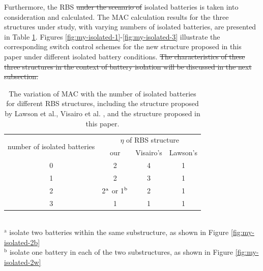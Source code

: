 \documentclass{article}
\providecommand{\DIFadd}[1]{{\protect\color{blue}\uwave{#1}}} %
\providecommand{\DIFdel}[1]{{\protect\color{red}\sout{#1}}}                      %
\providecommand{\DIFaddbegin}{} %
\providecommand{\DIFaddend}{} %
\providecommand{\DIFdelbegin}{} %
\providecommand{\DIFdelend}{} %
\providecommand{\DIFaddFL}[1]{\DIFadd{#1}} %
\providecommand{\DIFdelFL}[1]{\DIFdel{#1}} %
\providecommand{\DIFaddbeginFL}{} %
\providecommand{\DIFaddendFL}{} %
\providecommand{\DIFdelbeginFL}{} %
\providecommand{\DIFdelendFL}{} %
\newcommand{\DIFscaledelfig}{0.5}
\newlength{\DIFdelgraphicswidth} %
\newlength{\DIFdelgraphicsheight} %
\newcommand{\DIFaddincludegraphics}[2][]{{\color{blue}\fbox{\DIFOincludegraphics[#1]{#2}}}} %
\newcommand{\DIFdelincludegraphics}[2][]{%
\sbox{\DIFdelgraphicsbox}{\DIFOincludegraphics[#1]{#2}}%
\settoboxwidth{\DIFdelgraphicswidth}{\DIFdelgraphicsbox} %
\settoboxtotalheight{\DIFdelgraphicsheight}{\DIFdelgraphicsbox} %
\scalebox{\DIFscaledelfig}{%
\parbox[b]{\DIFdelgraphicswidth}{\usebox{\DIFdelgraphicsbox}\\[-\baselineskip] \rule{\DIFdelgraphicswidth}{0em}}\llap{\resizebox{\DIFdelgraphicswidth}{\DIFdelgraphicsheight}{%
\setlength{\unitlength}{\DIFdelgraphicswidth}%
\begin{picture}(1,1)%
\thicklines\linethickness{2pt} %
{\color[rgb]{1,0,0}\put(0,0){\framebox(1,1){}}}%
{\color[rgb]{1,0,0}\put(0,0){\line( 1,1){1}}}%
{\color[rgb]{1,0,0}\put(0,1){\line(1,-1){1}}}%
\end{picture}%
}\hspace*{3pt}}} %
} %
\DeclareRobustCommand{\DIFaddbegin}{\DIFOaddbegin \let\includegraphics\DIFaddincludegraphics} %
\DeclareRobustCommand{\DIFaddend}{\DIFOaddend \let\includegraphics\DIFOincludegraphics} %
\DeclareRobustCommand{\DIFdelbegin}{\DIFOdelbegin \let\includegraphics\DIFdelincludegraphics} %
\DeclareRobustCommand{\DIFdelend}{\DIFOaddend \let\includegraphics\DIFOincludegraphics} %
\DeclareRobustCommand{\DIFaddbeginFL}{\DIFOaddbeginFL \let\includegraphics\DIFaddincludegraphics} %
\DeclareRobustCommand{\DIFaddendFL}{\DIFOaddendFL \let\includegraphics\DIFOincludegraphics} %
\DeclareRobustCommand{\DIFdelbeginFL}{\DIFOdelbeginFL \let\includegraphics\DIFdelincludegraphics} %
\DeclareRobustCommand{\DIFdelendFL}{\DIFOaddendFL \let\includegraphics\DIFOincludegraphics} %
\begin{document}
Furthermore, the RBS \DIFdelbegin \DIFdel{under the scenario of }\DIFdelend \DIFaddbegin \DIFadd{with }\DIFaddend isolated batteries is taken into consideration and calculated. 
The MAC calculation results for the three structures under study, with varying numbers of isolated batteries, are presented in Table \ref{tab:isolated_mac}. 
Figures \ref{fig:my-isolated-1}-\ref{fig:my-isolated-3} illustrate the corresponding switch control schemes for the new structure proposed in this paper under different isolated battery conditions.
\DIFdelbegin \DIFdel{The characteristics of these three structures in the context of battery isolation will be discussed in the next subsection.
}\DIFdelend 

\begin{table}[htbp]
    \centering
    \caption{
      The variation of MAC with the number of isolated batteries for different RBS structures, including the structure proposed by Lawson et al., Visairo et al. , and the structure proposed in this paper.
      }
      \label{tab:isolated_mac}
      \begin{tabular}{cccc}
      \toprule
      \multirow{2}[4]{*}{number of isolated batteries} & \multicolumn{3}{c}{$\eta$ of RBS structure} \\
  \cmidrule{2-4}          & our  & Visairo's  & Lawson's  \\
      \midrule
      0     & 2     & 4     & 1 \\
      1     & 2     & 3     & 1 \\
      2     & 2\DIFdelbeginFL \DIFdelFL{$^{\rm a}$ }\DIFdelendFL \DIFaddbeginFL \DIFaddFL{$^{\mathrm{a}}$ }\DIFaddendFL or 1\DIFdelbeginFL \DIFdelFL{$^{\rm b}$ }\DIFdelendFL \DIFaddbeginFL \DIFaddFL{$^{\mathrm{b}}$ }\DIFaddendFL & 2     & 1 \\
      3     & 1     & 1     & 1 \\
      \bottomrule
      \end{tabular}
      \\
      \DIFdelbeginFL %
\DIFdelendFL \DIFaddbeginFL \footnotesize{$^{\mathrm{a}}$ isolate two batteries within the same substructure, as shown in Figure \ref{fig:my-isolated-2b}}\DIFaddendFL \\
      \DIFdelbeginFL %
\DIFdelendFL \DIFaddbeginFL \footnotesize{$^{\mathrm{b}}$ isolate one battery in each of the two substructures, as shown in Figure \ref{fig:my-isolated-2w}}
  \DIFaddendFL \end{table}
\end{document}
